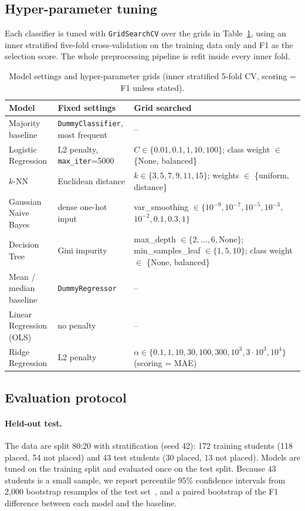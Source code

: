 \documentclass[runningheads]{llncs}
\begin{document}
\subsection{Hyper-parameter tuning}
Each classifier is tuned with \texttt{GridSearchCV} over the grids in Table~\ref{tab:grid}, using an inner stratified five-fold cross-validation on the training data only and F1 as the selection score. The whole preprocessing pipeline is refit inside every inner fold.

\begin{table}[htbp]
\centering
\caption{Model settings and hyper-parameter grids (inner stratified 5-fold CV, scoring = F1 unless stated).}\label{tab:grid}
\scriptsize
\begin{tabular}{>{\raggedright\arraybackslash}p{2.3cm}>{\raggedright\arraybackslash}p{2.3cm}>{\raggedright\arraybackslash}p{6.2cm}}
\toprule
Model & Fixed settings & Grid searched \\
\midrule
Majority baseline & \texttt{DummyClassifier}, most frequent & -- \\
Logistic Regression & L2 penalty, \texttt{max\_iter}=5000 & $C\in\{0.01,0.1,1,10,100\}$; class weight $\in$ \{None, balanced\} \\
$k$-NN & Euclidean distance & $k\in\{3,5,7,9,11,15\}$; weights $\in$ \{uniform, distance\} \\
Gaussian Naive Bayes & dense one-hot input & var\_smoothing $\in\{10^{-9},10^{-7},10^{-5},10^{-3},$ $10^{-2},0.1,0.3,1\}$ \\
Decision Tree & Gini impurity & max\_depth $\in\{2,\dots,6,\text{None}\}$; min\_samples\_leaf $\in\{1,5,10\}$; class weight $\in$ \{None, balanced\} \\
Mean / median baseline & \texttt{DummyRegressor} & -- \\
Linear Regression (OLS) & no penalty & -- \\
Ridge Regression & L2 penalty & $\alpha\in\{0.1,1,10,30,100,300,10^3,3\cdot10^3,10^4\}$ (scoring = MAE) \\
\bottomrule
\end{tabular}
\end{table}

\subsection{Evaluation protocol}
\paragraph{Held-out test.} The data are split 80:20 with stratification (seed 42): 172 training students (118 placed, 54 not placed) and 43 test students (30 placed, 13 not placed). Models are tuned on the training split and evaluated once on the test split. Because 43 students is a small sample, we report percentile 95\% confidence intervals from 2{,}000 bootstrap resamples of the test set~\cite{efron}, and a paired bootstrap of the F1 difference between each model and the baseline.
\end{document}
